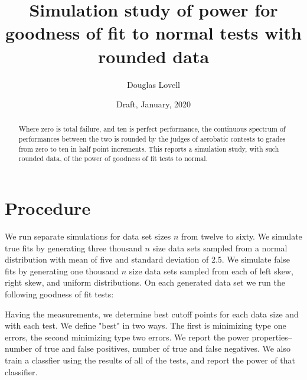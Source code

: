 \documentclass[10pt,twocolumn]{article}
\title{Simulation study of power for goodness of fit to normal tests with
  rounded data}
\author{Douglas Lovell}
\date{Draft, January, 2020}
\begin{document}
\maketitle
\begin{abstract}
Where zero is total failure, and ten is perfect performance, the continuous
spectrum of performances between the two is rounded by the judges of
aerobatic contests to grades from zero to ten in half point increments.
This reports a simulation study, with such rounded data, of the power of
goodness of fit tests to normal.
\end{abstract}

\section{Procedure}

We run separate simulations for data set sizes $n$ from twelve to sixty.
We simulate true fits by generating three thousand $n$ size data sets
sampled from a normal distribution with mean of five and standard deviation
of 2.5.
We simulate false fits by generating one thousand $n$ size data sets
sampled from each of left skew, right skew, and uniform distributions.
On each generated data set we run the following goodness of fit tests:
\begin{itemize}
\end{itemize}

Having the measurements, we determine best cutoff points for each data size
and with each test. We define "best" in two ways. The first is minimizing type
one errors, the second minimizing type two errors.
We report the power properties-- number of
true and false positives, number of true and false negatives. We also train
a classfier using the results of all of the tests, and report the power
of that classifier.



\end{document}
